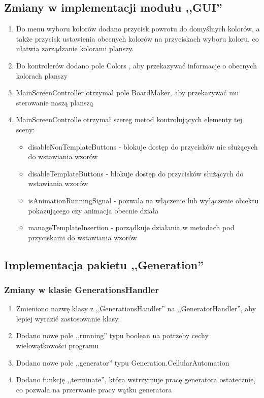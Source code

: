 \documentclass[a4paper,11pt]{article}
\begin{document}
\subsection{Zmiany w implementacji modułu ,,GUI''}

\begin{enumerate}
\item Do menu wyboru kolorów dodano przycisk powrotu do domyślnych kolorów, a także przycisk ustawienia obecnych kolorów na przyciskach wyboru koloru, co ułatwia zarządzanie kolorami planszy.
\item Do kontrolerów dodano pole Colors , aby przekazywać informacje o obecnych kolorach planszy
\item MainScreenController otrzymał pole BoardMaker, aby przekazywać mu sterowanie naszą planszą
\item MainScreenControlle otrzymał szereg metod kontrolujących elementy tej sceny:
	\begin{itemize}
	\item disableNonTemplateButtons - blokuje dostęp do przycisków nie służących do wstawiania wzorów
	\item disableTemplateButtons - blokuje dostęp do przycisków służących do wstawiania wzorów
	\item isAnimationRunningSignal - pozwala na włączenie lub wyłączenie obiektu pokazującego czy animacja obecnie działa
	\item manageTemplateInsertion - porządkuje działania w metodach pod przyciskami do wstawiania wzorów
	\end{itemize}
\end{enumerate}

\subsection{Implementacja pakietu ,,Generation''}
\subsubsection{Zmiany w klasie GenerationsHandler}
\begin{enumerate}
\item Zmieniono nazwę klasy z ,,GenerationsHandler'' na ,,GeneratorHandler'', aby lepiej wyrazić zastosowanie klasy.
\item Dodano nowe pole ,,running'' typu boolean na potrzeby cechy wielowątkowości programu
\item Dodano nowe pole ,,generator'' typu Generation.CellularAutomation
\item Dodano funkcję ,,terminate'', która wstrzymuje pracę generatora ostatecznie, co pozwala na przerwanie pracy wątku generatora
\end{enumerate}
\end{document}
